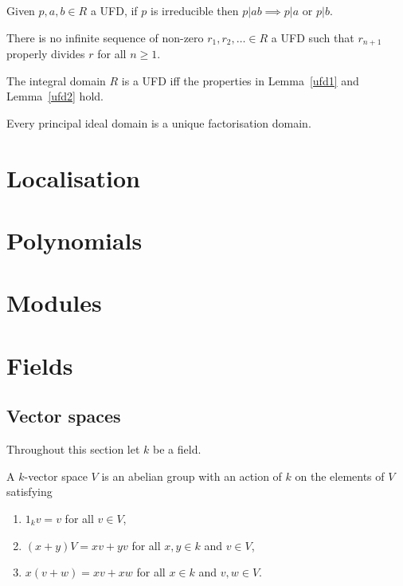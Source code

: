\documentclass{report}
\begin{document}
\begin{lemma}\label{ufd1}
    Given $p,a,b\in R$ a UFD, if $p$ is irreducible then $p|ab\implies p|a$ or $p|b$.
\end{lemma}

\begin{lemma}\label{ufd2}
    There is no infinite sequence of non-zero $r_1,r_2,\ldots\in R$ a UFD such that $r_{n+1}$ properly divides $r$ for all $n\geq1$.
\end{lemma}

\begin{theorem}
    The integral domain $R$ is a UFD iff the properties in Lemma~\ref{ufd1} and Lemma~\ref{ufd2} hold.
\end{theorem}

\begin{theorem}
    Every principal ideal domain is a unique factorisation domain.
\end{theorem}

\section{Localisation}
\section{Polynomials}
\section{Modules}
\section{Fields}

\subsection{Vector spaces}
Throughout this section let $k$ be a field.

\begin{definition}
    A $k$-vector space $V$ is an abelian group with an action of $k$ on the elements of $V$ satisfying \begin{enumerate}
        \item $1_k v=v$ for all $v\in V$,
        \item $(x+y)V = xv + yv$ for all $x,y\in k$ and $v\in V$,
        \item $x(v+w) = xv + xw$ for all $x\in k$ and $v,w\in V$.
    \end{enumerate}
\end{definition}
\end{document}
